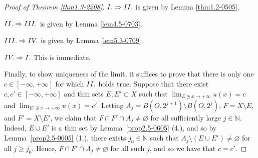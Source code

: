 \documentclass[10pt]{amsart}
\numberwithin{equation}{section}
\newcommand{\N}{\mathbb{N}}
\begin{document}
 \begin{proof}
 [Proof of Theorem \ref{thm1.3-2208}]

${\rm I.}\Rightarrow {\rm II.}$ is given by Lemma \ref{thm1.2-0505}.  

${\rm II.}\Rightarrow {\rm III.}$ is given by Lemma \ref{lem4.5-0703}. 


${\rm III.}\Rightarrow {\rm IV.}$ is given by Lemma \ref{lem5.3-0709}.

${\rm IV.}\Rightarrow {\rm I.}$ This is immediate.


Finally, to show uniqueness of the limit, it suffices to prove that there is only one $c\in[-\infty,+\infty]$ for which ${\rm II.}$ holds true.
Suppose that there exist $c,c'\in[-\infty,+\infty]$ and thin sets $E,E'\subset X$ such that $\lim_{E\not\ni x\to+\infty}u(x)=c$ and $\lim_{E'\not\ni x\to+\infty}u(x)=c'$.  Letting $A_j=B(O,2^{j+1})\setminus B(O,2^j)$, $F=X\setminus E$, and $F'=X\setminus E'$, we claim that $F\cap F'\cap A_j\ne\varnothing$ for all sufficiently large $j\in\mathbb N$.  Indeed, 
$E\cup E'$ is a thin set by Lemma~\ref{prop2.5-0605} (4.), and so by Lemma~\ref{prop2.5-0605} (1.), there exists $j_0\in\N$ such that $A_j\setminus (E\cup E')\ne\varnothing$ for all $j\ge j_0$.  Hence, $F\cap F'\cap A_j\ne\varnothing$ for all such $j$, and so we have that $c=c'$.  
 \end{proof}
\end{document}
